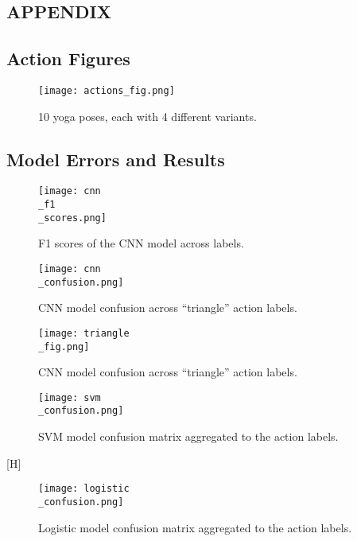 \documentclass[
	a4paper, %
	10pt, %
	unnumberedsections, %
	twoside, %
]{t0004}
\begin{document}
\clearpage
\begin{appendices}

\onecolumn

\section*{APPENDIX}

\subsection{Action Figures}

\begin{figure}[H]
	\texttt{[image: actions\_fig.png]}
	\caption{10 yoga poses, each with 4 different variants.}
	\label{fig:actionsfig}
\end{figure}

\subsection{Model Errors and Results}

\begin{figure}[H]
	\texttt{[image: cnn\\\_f1\\\_scores.png]}
	\caption{F1 scores of the CNN model across labels.}
	\label{fig:f1cnn}
\end{figure}

\begin{figure}[H]
	\texttt{[image: cnn\\\_confusion.png]}
	\caption{CNN model confusion across ``triangle'' action labels.}
	\label{fig:f1cnncf}
\end{figure}

\begin{figure}[H]
	\texttt{[image: triangle\\\_fig.png]}
	\caption{CNN model confusion across ``triangle'' action labels.}
	\label{fig:trianglecnn}
\end{figure}

\begin{figure}[H]
	\texttt{[image: svm\\\_confusion.png]}
	\caption{SVM model confusion matrix aggregated to the action labels.}
	\label{fig:svmconfusion}
\end{figure}[H]

\begin{figure}[H]
	\texttt{[image: logistic\\\_confusion.png]}
	\caption{Logistic model confusion matrix aggregated to the action labels.}
	\label{fig:logisticconfusion}
\end{figure}


\end{appendices}
\end{document}
